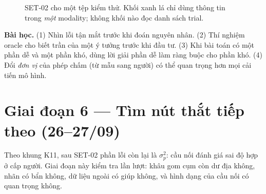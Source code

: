 \documentclass[11pt,a4paper,oneside]{report}
\begin{document}
\begin{figure}[h]
\centering
{}
\caption{SET-02 cho một tệp kiểm thử. Khối xanh lá chỉ dùng thông tin trong \emph{một} modality; không khối nào đọc danh sách trial.}
\end{figure}

\begin{lesson}
\textbf{Bài học.} (1) Nhìn lỗi tận mắt trước khi đoán nguyên nhân. (2) Thí nghiệm oracle cho biết trần của một ý tưởng trước khi đầu tư. (3) Khi bài toán có một phần dễ và một phần khó, dùng lời giải phần dễ làm ràng buộc cho phần khó. (4) Đổi \emph{đơn vị} của phép chấm (từ mẫu sang người) có thể quan trọng hơn mọi cải tiến mô hình.
\end{lesson}

\section{Giai đoạn 6 --- Tìm nút thắt tiếp theo (26--27/09)}
\label{sec:p6}

Theo khung K11, sau SET-02 phần lỗi còn lại là $\sigma_p^2$: cầu nối đánh giá sai độ hợp ở cấp người. Giai đoạn này kiểm tra lần lượt: khâu gom cụm còn dư địa không, nhãn có bẩn không, dữ liệu ngoài có giúp không, và hình dạng của cầu nối có quan trọng không.
\end{document}

